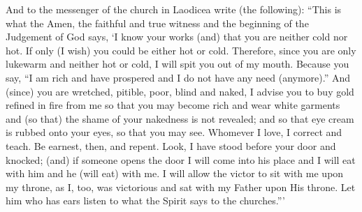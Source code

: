 \begin{pages}
\begin{Rightside}
		And to the messenger of the church in Laodicea write (the following): “This is what the Amen, the faithful and true witness and the beginning of the Judgement of God says, ‘I know your works (and) that you are neither cold nor hot. If only (I wish) you could be either hot or cold. Therefore, since you are only lukewarm and neither hot or cold, I will spit you out of my mouth. Because you say, “I am rich and have prospered and I do not have any need (anymore).” And (since) you are wretched, pitible, poor, blind and naked, I advise you to buy gold refined in fire from me so that you may become rich and wear white garments and (so that) the shame of your nakedness is not revealed; and so that eye cream is rubbed onto your eyes, so that you may see. Whomever I love, I correct and teach. Be earnest, then, and repent. Look, I have stood before your door and knocked; (and) if someone opens the door I will come into his place and I will eat with him and he (will eat) with me. I will allow the victor to sit with me upon my throne, as I, too, was victorious and sat with my Father upon His throne. Let him who has ears listen to what the Spirit says to the churches.”’
		\pend
        \endnumbering
    \end{Rightside}

\end{pages} 
\Pages